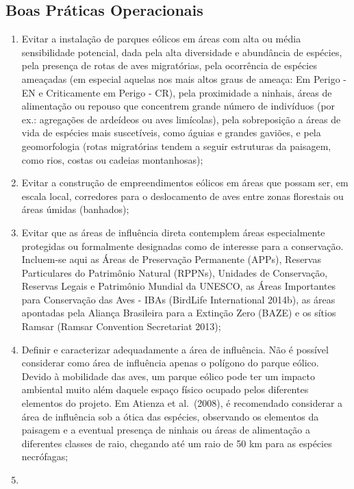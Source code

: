 \documentclass[
  oneside]{scrbook}
\begin{document}
\hypertarget{boas-praticas}{%
\subsection{Boas Práticas Operacionais}\label{boas-praticas}}

\begin{enumerate}
\def\labelenumi{\arabic{enumi}.}
\item
  Evitar a instalação de parques eólicos em áreas com alta ou média sensibilidade potencial, dada pela alta diversidade e abundância de espécies, pela presença de rotas de aves migratórias, pela ocorrência de espécies ameaçadas (em especial aquelas nos mais altos graus de ameaça: Em Perigo - EN e Criticamente em Perigo - CR), pela proximidade a ninhais, áreas de alimentação ou repouso que concentrem grande número de indivíduos (por ex.: agregações de ardeídeos ou aves limícolas), pela sobreposição a áreas de vida de espécies mais suscetíveis, como águias e grandes gaviões, e pela geomorfologia (rotas migratórias tendem a seguir estruturas da paisagem, como rios, costas ou cadeias montanhosas);
\item
  Evitar a construção de empreendimentos eólicos em áreas que possam ser, em escala local, corredores para o deslocamento de aves entre zonas florestais ou áreas úmidas (banhados);
\item
  Evitar que as áreas de influência direta contemplem áreas especialmente protegidas ou formalmente designadas como de interesse para a conservação. Incluem-se aqui as Áreas de Preservação Permanente (APPs), Reservas Particulares do Patrimônio Natural (RPPNs), Unidades de Conservação, Reservas Legais e Patrimônio Mundial da UNESCO, as Áreas Importantes para Conservação das Aves - IBAs (BirdLife International 2014b), as áreas apontadas pela Aliança Brasileira para a Extinção Zero (BAZE) e os sítios Ramsar (Ramsar Convention Secretariat 2013);
\item
  Definir e caracterizar adequadamente a área de influência. Não é possível considerar como área de influência apenas o polígono do parque eólico. Devido à mobilidade das aves, um parque eólico pode ter um impacto ambiental muito além daquele espaço físico ocupado pelos diferentes elementos do projeto. Em Atienza et al.~(2008), é recomendado considerar a área de influência sob a ótica das espécies, observando os elementos da paisagem e a eventual presença de ninhais ou áreas de alimentação a diferentes classes de raio, chegando até um raio de 50 km para as espécies necrófagas;
\item

\end{enumerate}
\end{document}
